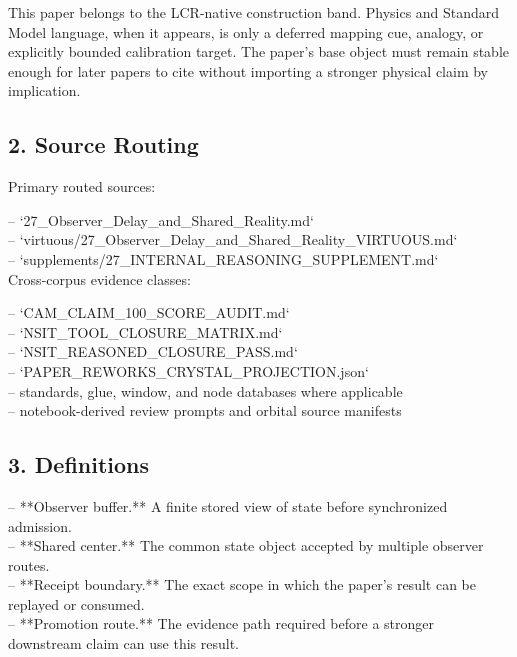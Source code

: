 \documentclass[11pt]{article}
\begin{document}
This paper belongs to the LCR-native construction band. Physics and Standard Model language, when it appears, is only a deferred mapping cue, analogy, or explicitly bounded calibration target. The paper's base object must remain stable enough for later papers to cite without importing a stronger physical claim by implication.

\subsection*{2. Source Routing}

Primary routed sources:

\noindent{}-- `27\_Observer\_Delay\_and\_Shared\_Reality.md`\\
\noindent{}-- `virtuous/27\_Observer\_Delay\_and\_Shared\_Reality\_VIRTUOUS.md`\\
\noindent{}-- `supplements/27\_INTERNAL\_REASONING\_SUPPLEMENT.md`\\

Cross-corpus evidence classes:

\noindent{}-- `CAM\_CLAIM\_100\_SCORE\_AUDIT.md`\\
\noindent{}-- `NSIT\_TOOL\_CLOSURE\_MATRIX.md`\\
\noindent{}-- `NSIT\_REASONED\_CLOSURE\_PASS.md`\\
\noindent{}-- `PAPER\_REWORKS\_CRYSTAL\_PROJECTION.json`\\
\noindent{}-- standards, glue, window, and node databases where applicable\\
\noindent{}-- notebook-derived review prompts and orbital source manifests\\

\subsection*{3. Definitions}

\noindent{}-- **Observer buffer.** A finite stored view of state before synchronized admission.\\
\noindent{}-- **Shared center.** The common state object accepted by multiple observer routes.\\
\noindent{}-- **Receipt boundary.** The exact scope in which the paper's result can be replayed or consumed.\\
\noindent{}-- **Promotion route.** The evidence path required before a stronger downstream claim can use this result.\\
\end{document}
